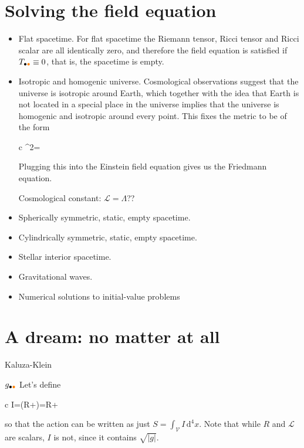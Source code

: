 \documentclass[11pt,oneside%
]{memoir}
\newenvironment{eqna}{\begin{IEEEeqnarray*}{c}}{\end{IEEEeqnarray*}\ignorespacesafterend}
\newcommand{\dd}{\mathrm{d}}
\newcommand{\coa}{{\color{black}\bullet}}
\newcommand{\cob}{{\color{oranssi}\bullet}}
\begin{document}
\section{Solving the field equation}

\begin{itemize}
\item Flat spacetime. For flat spacetime the Riemann tensor, Ricci tensor and Ricci scalar are all identically zero, and therefore the field equation is satisfied if \(T_{\coa\cob}\equiv0\), that is, the spacetime is empty.
\item Isotropic and homogenic universe. Cosmological observations suggest that the universe is isotropic around Earth, which together with the idea that Earth is not located in a special place in the universe implies that the universe is homogenic and isotropic around every point. This fixes the metric to be of the form
\begin{eqna}
\dd\tau^2=
\end{eqna}
Plugging this into the Einstein field equation gives us the Friedmann equation.

Cosmological constant: \(\mathcal{L}=\Lambda\)??
\item Spherically symmetric, static, empty spacetime.
\item Cylindrically symmetric, static, empty spacetime.
\item Stellar interior spacetime.
\item Gravitational waves.
\item Numerical solutions to initial-value problems

\end{itemize}

\section{A dream: no matter at all}

Kaluza-Klein

\newpage

 \(g_{\coa\cob}\) Let's define
\begin{eqna}
I=(R+)=R+
\end{eqna}
so that the action can be written as just \(S=\int_{\mathcal{V}}I\,\dd^4x\). Note that while \(R\) and \(\mathcal{L}\) are scalars, \(I\) is not, since it contains \(\sqrt{|g|}\).
\end{document}
